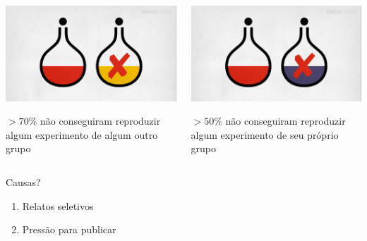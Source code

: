 \documentclass{beamer}
\begin{document}
\begin{frame}
  \begin{center}

    \begin{columns}
      \begin{column}{5cm}
        \includegraphics[width=\textwidth]{Imagens/reprod-nature1}

$>70\%$ não conseguiram reproduzir algum experimento de algum outro grupo
      \end{column}
      \begin{column}{5cm}
        \includegraphics[width=\textwidth]{Imagens/reprod-nature2}

$>50\%$ não conseguiram reproduzir algum experimento de seu próprio grupo
      \end{column}
    \end{columns}
  \end{center}
\end{frame}

\begin{frame}
  \begin{block}{Causas?}
    \begin{enumerate}
    \item Relatos seletivos
    \item Pressão para publicar
    \end{enumerate}
  \end{block}
\end{frame}
\end{document}
